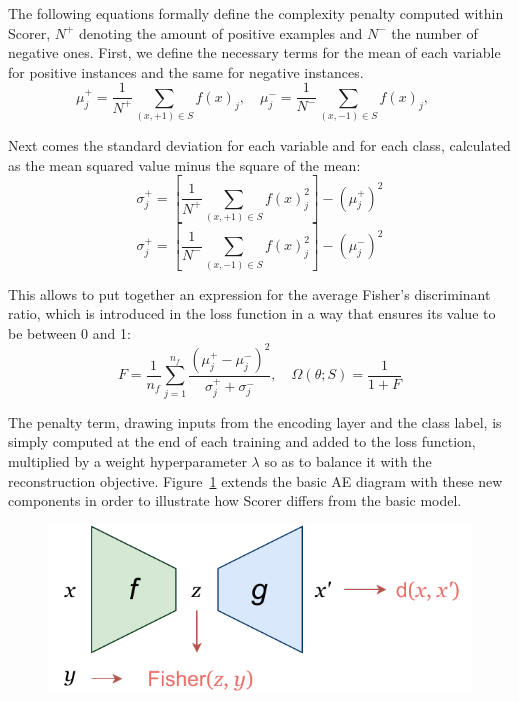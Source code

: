 The following equations formally define the complexity penalty computed within Scorer, $N^+$ denoting the amount of positive examples and $N^-$ the number of negative ones. First, we define the necessary terms for the mean of each variable for positive instances and the same for negative instances.
\begin{equation} \mu_j^+ = \frac 1 {N^+} \sum_{(x,+1)\in S} f(x)_j,\quad \mu_j^- = \frac 1 {N^-} \sum_{(x,-1)\in S} f(x)_j,\quad\end{equation}

Next comes the standard deviation for each variable and for each class, calculated as the mean squared value minus the square of the mean:
\begin{equation}\sigma_j^+ = \left[\frac 1 {N^+} \sum_{(x,+1)\in S} f(x)_j^2\right] - (\mu_j^+)^2 \end{equation}
\begin{equation}\sigma_j^+ = \left[\frac 1 {N^-} \sum_{(x,-1)\in S} f(x)_j^2\right] - (\mu_j^-)^2 \end{equation}

This allows to put together an expression for the average Fisher's discriminant ratio, which is introduced in the loss function in a way that ensures its value to be between 0 and 1:
\begin{equation}F=\frac{1}{n_f}\sum_{j=1}^{n_f} \frac{(\mu_j^+-\mu_j^-)^2}{\sigma_j^++\sigma_j^-},\quad\Omega(\theta;S)=\frac{1}{1 + F}\end{equation}

The penalty term, drawing inputs from the encoding layer and the class label, is simply computed at the end of each training and added to the loss function, multiplied by a weight hyperparameter $\lambda$ so as to balance it with the reconstruction objective. Figure~\ref{p6fig.scorer} extends the basic AE diagram with these new components in order to illustrate how Scorer differs from the basic model.


\begin{figure}[ht]
  \centering
  \includegraphics[width=.35\textwidth]{scorer.pdf}
  \caption{\label{p6fig.scorer}}
\end{figure}



